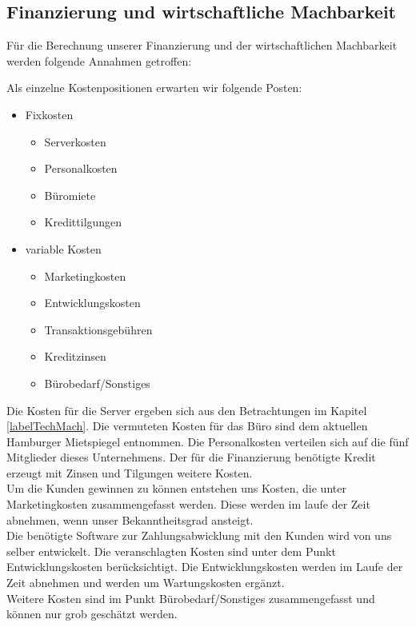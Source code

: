 \newpage
\subsection{Finanzierung und wirtschaftliche Machbarkeit}\label{labelWirtMach}

Für die Berechnung unserer Finanzierung und der wirtschaftlichen Machbarkeit werden folgende Annahmen getroffen:

Als einzelne Kostenpositionen erwarten wir folgende Posten:
\begin{itemize}
\item Fixkosten
 \begin{itemize}
\item Serverkosten
\item Personalkosten
\item Büromiete
\item Kredittilgungen
 \end{itemize}
\item variable Kosten
\begin{itemize}
\item Marketingkosten
\item Entwicklungskosten
\item Transaktionsgebühren
\item Kreditzinsen
\item Bürobedarf/Sonstiges
\end{itemize}
\end{itemize}

Die Kosten für die Server ergeben sich aus den Betrachtungen im Kapitel \ref{labelTechMach}. Die vermuteten Kosten für das Büro sind dem aktuellen Hamburger Mietspiegel entnommen. Die Personalkosten verteilen sich auf die fünf Mitglieder dieses Unternehmens. Der für die Finanzierung benötigte Kredit erzeugt mit Zinsen und Tilgungen weitere Kosten.\\
Um die Kunden gewinnen zu können entstehen uns Kosten, die unter Marketingkosten zusammengefasst werden. Diese werden im laufe der Zeit abnehmen, wenn unser Bekanntheitsgrad ansteigt.\\
Die benötigte Software zur Zahlungsabwicklung mit den Kunden wird von uns selber entwickelt. Die veranschlagten Kosten sind unter dem Punkt Entwicklungskosten berücksichtigt. Die Entwicklungskosten werden im Laufe der Zeit abnehmen und werden um Wartungskosten ergänzt.\\
Weitere Kosten sind im Punkt Bürobedarf/Sonstiges zusammengefasst und können nur grob geschätzt werden.

